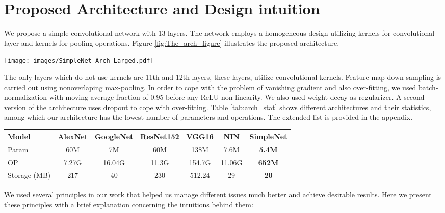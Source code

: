 \documentclass{article} \usepackage{lets_keepit_simple,times}
\begin{document}
\section{Proposed Architecture and Design intuition} \label{sec:arch}
We propose a simple convolutional network with 13 layers. The network employs a homogeneous design utilizing  kernels for convolutional layer and  kernels for pooling operations. Figure \ref{fig:The_arch_figure} illustrates the proposed architecture.

\begin{figure*}[h]
\begin{center}
\texttt{[image: images/SimpleNet\_Arch\_Larged.pdf]}
\end{center}
 \caption{Showing the base architecture with no drop-out}
\label{fig:The_arch_figure}
\end{figure*}



The only layers which do not use  kernels are 11th and 12th layers, these layers, utilize  convolutional kernels. Feature-map down-sampling is carried out using nonoverlaping  max-pooling. In order to cope with the problem of vanishing gradient and also over-fitting, we used batch-normalization with moving average fraction of 0.95 before any ReLU non-linearity. We also used weight decay as regularizer. A second version of the architecture uses dropout to cope with over-fitting. Table \ref{tab:arch_stat} shows different architectures and their statistics, among which our architecture has the lowest number of parameters and operations. The extended list is provided in the appendix.


\begin{table*}[h!]
\caption{showing different architectures statistics}
\begin{center}
\begin{tabular}{lcccccc}
Model & AlexNet & GoogleNet & ResNet152 & VGG16 & NIN & \textbf{SimpleNet} \\
\hline
Param & 60M & 7M & 60M	& 138M	& 7.6M	& \textbf{5.4M}\\
OP &7.27G & 16.04G & 11.3G & 154.7G &	11.06G & \textbf{652M}\\
Storage (MB) &217 & 40 & 230 & 512.24 & 29 & \textbf{20}\\
\hline
\end{tabular}
\end{center}
\label{tab:arch_stat}
\end{table*}

We used several principles in our work that helped us manage different issues much better and achieve desirable results. Here we present these principles with a brief explanation concerning the intuitions behind them: 
\end{document}
